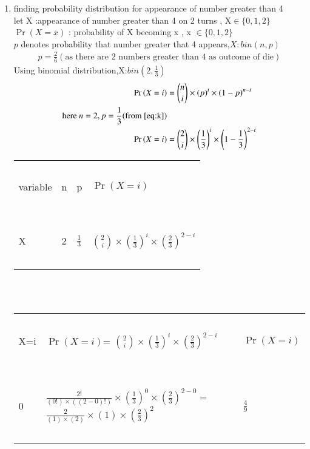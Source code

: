 \documentclass[journal,12pt,onecolumn]{IEEEtran}
\providecommand{\pr}[1]{\ensuremath{\Pr\left(#1\right)}}
\providecommand{\brak}[1]{\ensuremath{\left(#1\right)}}
\theoremstyle{remark}
\begin{document}
\begin{enumerate}
\item finding probability distribution for appearance of number greater than 4\\
let X :appearance of number greater than 4 on 2 turns , X$\in \{0,1,2\}$\\
$\pr{X=x}$ : probability of X becoming x , x $\in \{ 0,1,2 \}$\\
$p$ denotes probability that number greater that 4 appears,$X:bin(n,p)$ 
\begin{align}
p=\frac{2}{6}(\text{as there are 2 numbers greater than  4 as outcome of die})\label{eq:k} 
\end{align}
Using binomial distribution,X:$bin(2,\frac{1}{3})$
\begin{align}
\pr{X=i}&={n \choose i}\times(p)^i\times(1-p)^{n-i}\\
\text{here } n=2,p=\frac{1}{3}  (\text{from } \eqref{eq:k})\\
\pr{X=i}&={2 \choose i}\times \brak{\frac{1}{3}}^i\times\brak{1-\frac{1}{3}}^{2-i} \label{eq:r}
\end{align}
\begin{tabular}{|l|l|l|l|}
\hline
\ &\ &\ &\ \\
\large variable & \large n & \large p & \large $\pr{X=i}$\\
\ & \ & \ & \  \\
\hline
\ &\ &\ &\ \\
\large {X} & \large{2} &  \large$\frac{1}{3}$ & \large${2 \choose i}\times \brak{\frac{1}{3}}^i\times\brak{\frac{2}{3}}^{2-i}$\\
\ & \ & \ & \  \\
\hline
\end{tabular}\\
\vspace{2mm}\\
\begin{tabular}{|l|l|l|}
\hline
\ & \ & \ \\
X=i & $\pr{X=i}$= \large${2 \choose i}\times \brak{\frac{1}{3}}^i\times\brak{\frac{2}{3}}^{2-i}$ & $\pr{X=i}$\\
\ & \ & \ \\
\hline
\ & \ & \ \\
0 & \large $\frac{2!}{(0!)\times((2-0)!)}\times\brak{\frac{1}{3}}^0\times\brak{\frac{2}{3}}^{2-0}
 = $\large$ \frac{2}{(1)\times(2)}\times(1)\times\brak{\frac{2}{3}}^{2} $ &\Large $\frac{4}{9}$\\
 \ & \ & \ \\

\end{tabular}
\end{enumerate}
\end{document}
